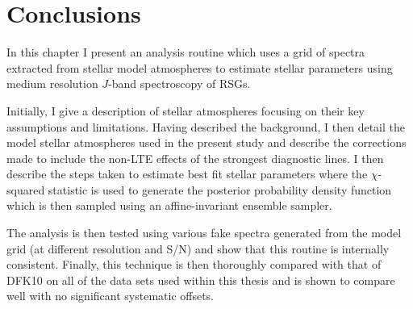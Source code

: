 
\section{Conclusions} %
\label{sec:conclusions}

In this chapter I present an analysis routine which uses a grid of spectra extracted from stellar model atmospheres to estimate stellar parameters using medium resolution $J$-band spectroscopy of RSGs.

Initially, I give a description of stellar atmospheres focusing on their key assumptions and limitations.
Having described the background, I then detail the model stellar atmospheres used in the present study and describe the corrections made to include the non-LTE effects of the strongest diagnostic lines.
I then describe the steps taken to estimate best fit stellar parameters where the $\chi$-squared statistic is used to generate the posterior probability density function which is then sampled using an affine-invariant ensemble sampler.

The analysis is then tested using various fake spectra generated from the model grid (at different resolution and S/N) and show that this routine is internally consistent.
Finally, this technique is then thoroughly compared with that of DFK10 on all of the data sets used within this thesis and is shown to compare well with no significant systematic offsets.

% 
